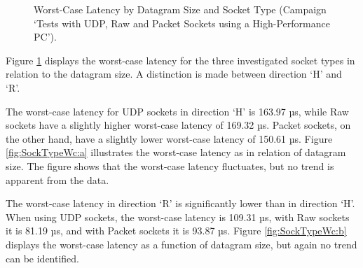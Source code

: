 \begin{figure}[h!]
  \centering
  \caption{Worst-Case Latency by Datagram Size and Socket Type (Campaign `Tests with UDP, Raw and Packet Sockets using a High-Performance PC').}
  \label{fig:SockTypeWc}
\end{figure}

Figure \ref{fig:SockTypeWc} displays the worst-case latency for the three investigated socket types in relation to the datagram size. A distinction is made between direction `H' and `R'.

The worst-case latency for UDP sockets in direction `H' is 163.97 µs, while Raw sockets have a slightly higher worst-case latency of 169.32 µs. Packet sockets, on the other hand, have a slightly lower worst-case latency of 150.61 µs. Figure \ref{fig:SockTypeWc:a} illustrates the worst-case latency as in relation of datagram size. The figure shows that the worst-case latency fluctuates, but no trend is apparent from the data.

The worst-case latency in direction `R' is significantly lower than in direction `H'. When using UDP sockets, the worst-case latency is 109.31 µs, with Raw sockets it is 81.19 µs, and with Packet sockets it is 93.87 µs. Figure \ref{fig:SockTypeWc:b} displays the worst-case latency as a function of datagram size, but again no trend can be identified.

